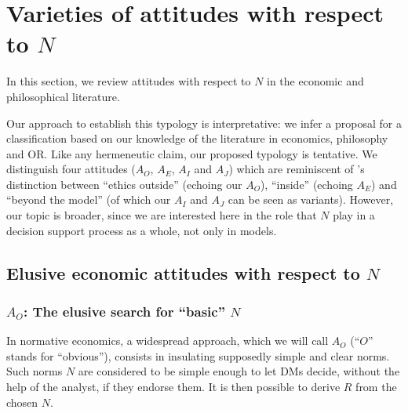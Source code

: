 \documentclass[preprint, french, english, 11pt, authoryear]{elsarticle}%
\newcommand{\protectforpdf}[1]{\texorpdfstring{\ensuremath{#1}}{#1}}
\newcommand{\possessivecite}[1]{\citeauthor{#1}’s \citeyearpar{#1}}
\begin{document}
\section{Varieties of attitudes with respect to \protectforpdf{N}}
\label{sec:existing}
In this section, we review attitudes with respect to $N$ in the economic and philosophical literature.
\begin{changebar}
Our approach to establish this typology is interpretative: we infer a proposal for a classification based on our knowledge of the literature in economics, philosophy and \ac{OR}.
Like any hermeneutic claim, our proposed typology is tentative.
We distinguish four attitudes ($A_O$, $A_E$, $A_I$ and $A_J$) which are reminiscent of \possessivecite{le_menestrel_ethics_2004} distinction between ``ethics outside'' (echoing our $A_O$), ``inside'' (echoing $A_E$) and ``beyond the model'' (of which our $A_I$ and $A_J$ can be seen as variants). 
 However, our topic is broader, since we are interested here in the role that $N$ play in a decision support process as a whole, not only in models.
\end{changebar}

\subsection{Elusive economic attitudes with respect to \protectforpdf{N}}
\subsubsection{\texorpdfstring{$A_O$}{AO}: The elusive search for ``basic'' \protectforpdf{N}}
In normative economics, a widespread approach, which we will call $A_O$ (``$O$'' stands for “obvious”), consists in insulating supposedly simple and clear norms. 
Such norms $N$ are considered to be simple enough to let \acp{DM} decide, without the help of the analyst, if they endorse them. It is then possible to derive $R$ from the chosen $N$.
\end{document}
